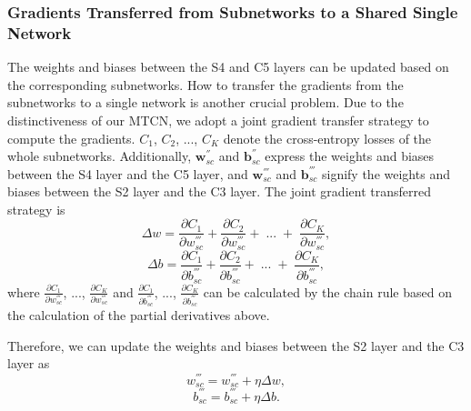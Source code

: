 \documentclass{sig-alternate-05-2015}
\begin{document}
\subsubsection{Gradients Transferred from Subnetworks to a Shared Single Network}
The weights and biases between the S4 and C5 layers can be updated based on the corresponding subnetworks. How to transfer the gradients from the subnetworks to a single network is another crucial problem. Due to the distinctiveness of our MTCN, we adopt a joint gradient transfer strategy to compute the gradients. {$C_1$, $C_2$, ..., $C_K$} denote the cross-entropy losses of the whole subnetworks. Additionally, $\textbf{w}_{sc}^{''}$ and $\textbf{b}_{sc}^{''}$ express the weights and biases between the S4 layer and the C5 layer, and $\textbf{w}_{sc}^{'''}$ and $\textbf{b}_{sc}^{'''}$ signify the weights and biases between the S2 layer and the C3 layer. The joint gradient transferred strategy is
\begin{equation}\label{}
\Delta w = \frac{{\partial {C_1}}}{{\partial w_{sc}^{'''}}} + \frac{{\partial {C_2}}}{{\partial w_{sc}^{'''}}} + \;...\; + \;\frac{{\partial {C_K}}}{{\partial w_{sc}^{'''}}},
\end{equation}
\begin{equation}\label{}
\Delta b = \frac{{\partial {C_1}}}{{\partial b_{sc}^{'''}}} + \frac{{\partial {C_2}}}{{\partial b_{sc}^{'''}}} + \;...\; + \;\frac{{\partial {C_K}}}{{\partial b_{sc}^{'''}}},
\end{equation}
where $\frac{{\partial {C_1}}}{{\partial w_{sc}^{'''}}}$, ..., $\frac{{\partial {C_K}}}{{\partial w_{sc}^{'''}}}$ and $\frac{{\partial {C_1}}}{{\partial b_{sc}^{'''}}}$, ..., $\frac{{\partial {C_K}}}{{\partial b_{sc}^{'''}}}$ can be calculated by the chain rule based on the calculation of the partial derivatives above.

Therefore, we can update the weights and biases between the S2 layer and the C3 layer as
\begin{equation}\label{}
w_{sc}^{'''} = w_{sc}^{'''} + \eta \Delta w,
\end{equation}
\begin{equation}\label{}
b_{sc}^{'''} = b_{sc}^{'''} + \eta \Delta b.
\end{equation}
\end{document}
